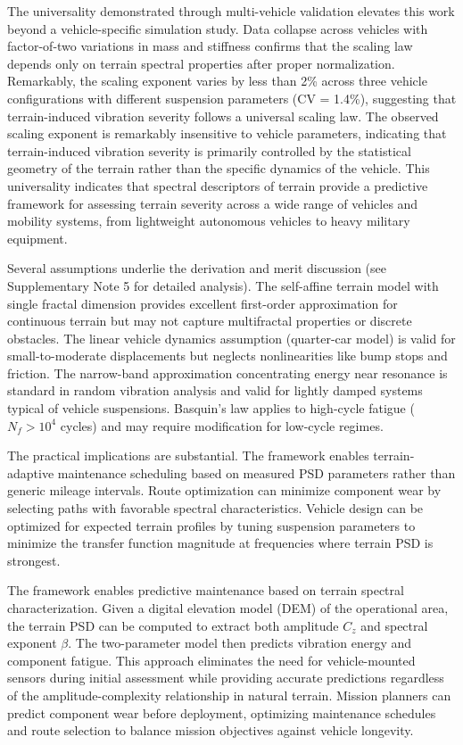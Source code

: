\documentclass[11pt]{article}
\begin{document}
The universality demonstrated through multi-vehicle validation elevates this work beyond a vehicle-specific simulation study. Data collapse across vehicles with factor-of-two variations in mass and stiffness confirms that the scaling law depends only on terrain spectral properties after proper normalization. Remarkably, the scaling exponent varies by less than 2\% across three vehicle configurations with different suspension parameters (CV = 1.4\%), suggesting that terrain-induced vibration severity follows a universal scaling law. The observed scaling exponent is remarkably insensitive to vehicle parameters, indicating that terrain-induced vibration severity is primarily controlled by the statistical geometry of the terrain rather than the specific dynamics of the vehicle. This universality indicates that spectral descriptors of terrain provide a predictive framework for assessing terrain severity across a wide range of vehicles and mobility systems, from lightweight autonomous vehicles to heavy military equipment.

Several assumptions underlie the derivation and merit discussion (see Supplementary Note 5 for detailed analysis). The self-affine terrain model with single fractal dimension provides excellent first-order approximation for continuous terrain but may not capture multifractal properties or discrete obstacles\cite{Persson2005}. The linear vehicle dynamics assumption (quarter-car model) is valid for small-to-moderate displacements but neglects nonlinearities like bump stops and friction\cite{Wong2022,Gillespie1992}. The narrow-band approximation concentrating energy near resonance is standard in random vibration analysis\cite{Miles1954,Bendat2010} and valid for lightly damped systems typical of vehicle suspensions. Basquin's law applies to high-cycle fatigue ($N_f > 10^4$ cycles) and may require modification for low-cycle regimes\cite{Dowling2013}.


The practical implications are substantial. The framework enables terrain-adaptive maintenance scheduling based on measured PSD parameters rather than generic mileage intervals. Route optimization can minimize component wear by selecting paths with favorable spectral characteristics. Vehicle design can be optimized for expected terrain profiles by tuning suspension parameters to minimize the transfer function magnitude at frequencies where terrain PSD is strongest.

The framework enables predictive maintenance based on terrain spectral characterization. Given a digital elevation model (DEM) of the operational area, the terrain PSD can be computed to extract both amplitude $C_z$ and spectral exponent $\beta$. The two-parameter model then predicts vibration energy and component fatigue. This approach eliminates the need for vehicle-mounted sensors during initial assessment while providing accurate predictions regardless of the amplitude-complexity relationship in natural terrain. Mission planners can predict component wear before deployment, optimizing maintenance schedules and route selection to balance mission objectives against vehicle longevity.
\end{document}
